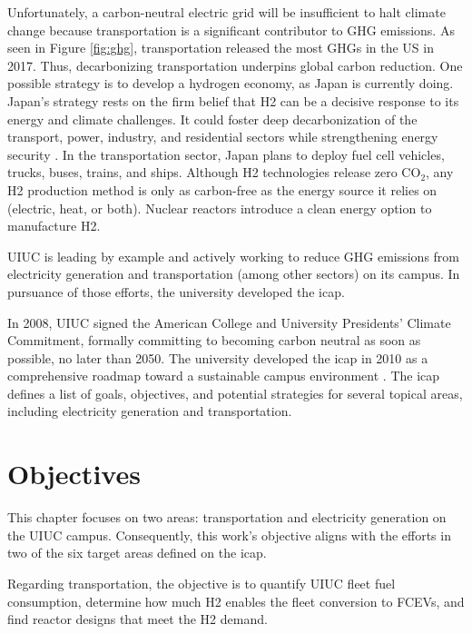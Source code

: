 Unfortunately, a carbon-neutral electric grid will be insufficient to halt climate change because transportation is a significant contributor to \gls{GHG} emissions.
As seen in Figure \ref{fig:ghg}, transportation released the most \glspl{GHG} in the \gls{US} in 2017. Thus, decarbonizing transportation underpins global carbon reduction.
One possible strategy is to develop a hydrogen economy, as Japan is currently doing.
Japan's strategy rests on the firm belief that \gls{H2} can be a decisive response to its energy and climate challenges.
It could foster deep decarbonization of the transport, power, industry, and residential sectors while strengthening energy security \cite{nagashima_japans_2018}.
In the transportation sector, Japan plans to deploy fuel cell vehicles, trucks, buses, trains, and ships.
Although \gls{H2} technologies release zero CO$_2$, any \gls{H2} production method is only as carbon-free as the energy source it relies on (electric, heat, or both).
Nuclear reactors introduce a clean energy option to manufacture \gls{H2}.

\gls{UIUC} is leading by example and actively working to reduce \gls{GHG} emissions from electricity generation and transportation (among other sectors) on its campus.
In pursuance of those efforts, the university developed the \gls{icap}.

In 2008, \gls{UIUC} signed the American College and University Presidents' Climate Commitment, formally committing to becoming carbon neutral as soon as possible, no later than 2050.
The university developed the \gls{icap} in 2010 as a comprehensive roadmap toward a sustainable campus environment \cite{isee_illinois_2015}.
The \gls{icap} defines a list of goals, objectives, and potential strategies for several topical areas, including electricity generation and transportation.

\section{Objectives}
\label{sec:hydro-objectives}

This chapter focuses on two areas: transportation and electricity generation on the \gls{UIUC} campus.
Consequently, this work's objective aligns with the efforts in two of the six target areas defined on the \gls{icap}.

Regarding transportation, the objective is to quantify UIUC fleet fuel consumption, determine how much \gls{H2} enables the fleet conversion to \glspl{FCEV}, and find reactor designs that meet the \gls{H2} demand.

